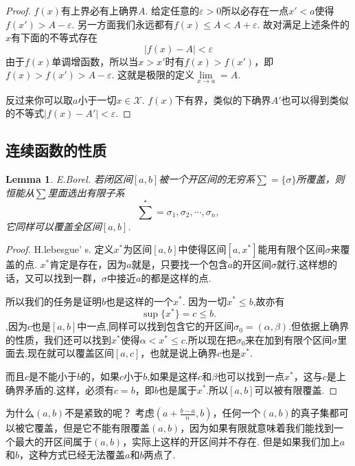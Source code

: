 \documentclass{article}
\newtheorem{lemma}[theorem]{Lemma}
\begin{document}
\begin{proof}
$f(x)$有上界必有上确界$A$. 给定任意的$\varepsilon > 0$所以必存在一点$x'<a$使得$f(x') > A-\varepsilon$. 另一方面我们永远都有$f(x) \leq A < A+\varepsilon.$ 故对满足上述条件的$x$有下面的不等式存在
$$
	|f(x)-A| < \varepsilon 
$$
由于$f(x)$单调增函数，所以当$x >x'$时有$f(x)>f(x')$，即$f(x) > f(x') > A-\varepsilon$. 这就是极限的定义$\lim\limits_{x \rightarrow a} = A$.

反过来你可以取$a$小于一切$x \in \mathcal{X}$. $f(x)$下有界，类似的下确界$A'$也可以得到类似的不等式$|f(x)-A'| < \varepsilon$.
\end{proof}

\newpage
\subsection{连续函数的性质}
\begin{lemma}
\rm E.Borel. 若闭区间$[a,b]$被一个开区间的无穷系$\sum = \{\sigma\}$所覆盖，则恒能从$\sum$里面选出有限子系\[\sum^{*} = {\sigma_1,\sigma_2,\cdots,\sigma_n},\]它同样可以覆盖全区间$[a,b]$.
\end{lemma}

\begin{proof}
\rm H.lebesgue' s. 定义$x^*$为区间$[a,b]$中使得区间$[a,x^*]$能用有限个区间$\sigma$来覆盖的点. $x^*$肯定是存在，因为$a$就是，只要找一个包含$a$的开区间$\sigma$就行,这样想的话，又可以找到一群，$\sigma$中接近$a$的都是这样的点.

所以我们的任务是证明$b$也是这样的一个$x^*$.
因为一切$x^* \leq b$,故亦有\[\sup\{x^*\}=c \leq b.\],因为$c$也是$[a,b]$中一点,同样可以找到包含它的开区间$\sigma_0=(\alpha,\beta)$.但依据上确界的性质，我们还可以找到$x^*$使得$\alpha < x^* \leq c$.所以现在把$\sigma_0$来在加到有限个区间$\sigma$里面去,现在就可以覆盖区间$[a,c]$，也就是说上确界$c$也是$x^*$.

而且$c$是不能小于$b$的，如果$c$小于$b$,如果是这样$c$和$\beta$也可以找到一点$x^*$，这与$c$是上确界矛盾的.这样，必须有$c=b$，即$b$也是属于$x^*$.所以$[a,b]$可以被有限覆盖.
\end{proof}


为什么$(a,b)$不是紧致的呢？ 考虑$(a+\frac{b-a}{n},b)$，任何一个$(a,b)$的真子集都可以被它覆盖，但是它不能有限覆盖$(a,b)$，因为如果有限就意味着我们能找到一个最大的开区间属于$(a,b)$，实际上这样的开区间并不存在. 但是如果我们加上$a$和$b$，这种方式已经无法覆盖$a$和$b$两点了.
\end{document}
